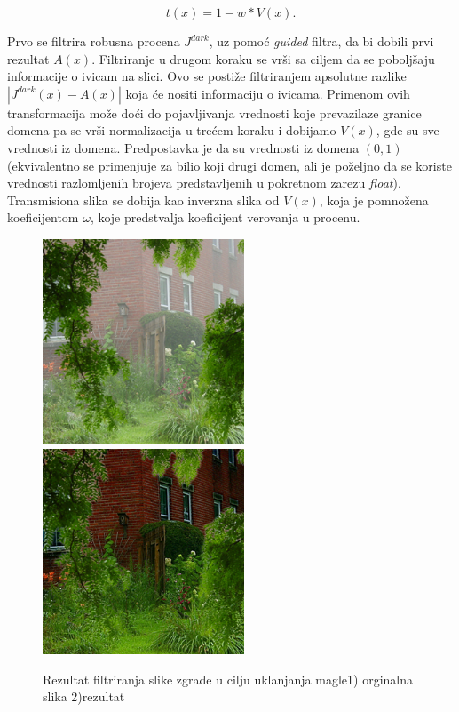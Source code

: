 \documentclass[a4paper,12pt,titlepage]{article}
\begin{document}
\begin{equation}\label{eq:haze7}
t(x) = 1 - w * V(x).
\end{equation}

Prvo se filtrira robusna procena $J^{dark}$, uz pomoć \emph{guided} filtra, da bi dobili prvi rezultat $A(x)$. Filtriranje u drugom koraku se vrši sa ciljem da se poboljšaju informacije o ivicam na slici. Ovo se postiže filtriranjem apsolutne razlike $|J^{dark}(x) - A(x)|$ koja će nositi informaciju o ivicama. Primenom ovih transformacija može doći do pojavljivanja vrednosti koje prevazilaze granice domena pa se vrši normalizacija u trećem koraku i dobijamo $V(x)$, gde su sve vrednosti iz domena. Predpostavka je da su vrednosti iz domena $(0, 1)$ (ekvivalentno se primenjuje za bilio koji drugi domen, ali je poželjno da se koriste vrednosti razlomljenih brojeva predstavljenih u pokretnom zarezu \emph{float}). Transmisiona slika se dobija kao inverzna slika od $V(x)$, koja je pomnožena koeficijentom $\omega$, koje predstvalja koeficijent verovanja u procenu.

\begin{figure}[ht!]
\centering
\includegraphics[width=60mm]{img/haze.png}
\includegraphics[width=60mm]{img/hazeRes.png}
\caption{Rezultat filtriranja slike zgrade u cilju uklanjanja magle1) orginalna slika 2)rezultat}
\label{dehaze}
\end{figure}   
\end{document}
